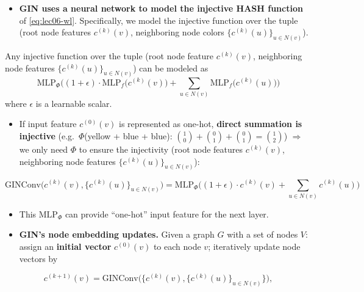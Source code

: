 \begin{itemize}
  \item \textbf{GIN uses a neural network to model the injective HASH function}
    of \cref{eq:lec06-wl}. Specifically, we model the injective function over the
    tuple (root node features $c^{(k)}(v)$, neighboring node colors
    $\{c^{(k)}(u)\}_{u\in N(v)}$).
\end{itemize}
\begin{proposition}[Xu et al.\ ICLR 2019]\label{prop:lec06-tuple}
  Any injective function over the tuple (root node feature $c^{(k)}(v)$,
  neighboring node features $\{c^{(k)}(u)\}_{u\in N(v)}$) can be modeled as
  \begin{equation}\label{eq:lec06-gintuple}
    \mathrm{MLP}_{\Phi}\Big((1+\epsilon)\cdot\mathrm{MLP}_f\big(c^{(k)}(v)\big)
      + \sum_{u\in N(v)}\mathrm{MLP}_f\big(c^{(k)}(u)\big)\Big)
  \end{equation}
  where $\epsilon$ is a learnable scalar.
\end{proposition}
\begin{itemize}
  \item If input feature $c^{(0)}(v)$ is represented as one-hot, \textbf{direct
    summation is injective} (e.g.\ $\Phi$(yellow + blue + blue):
    $\binom{1}{0}+\binom{0}{1}+\binom{0}{1}=\binom{1}{2}$) $\Rightarrow$ we only
    need $\Phi$ to ensure the injectivity (root node features $c^{(k)}(v)$,
    neighboring node features $\{c^{(k)}(u)\}_{u\in N(v)}$):
\end{itemize}
\begin{equation}\label{eq:lec06-ginconv}
  \mathrm{GINConv}\Big(c^{(k)}(v), \{c^{(k)}(u)\}_{u\in N(v)}\Big)
  = \mathrm{MLP}_{\Phi}\Big((1+\epsilon)\cdot c^{(k)}(v) + \sum_{u\in N(v)} c^{(k)}(u)\Big)
\end{equation}
\begin{itemize}
  \item This $\mathrm{MLP}_{\Phi}$ can provide ``one-hot'' input feature for the
    next layer.
  \item \textbf{GIN's node embedding updates.} Given a graph $G$ with a set of
    nodes $V$: assign an \textbf{initial vector} $c^{(0)}(v)$ to each node $v$;
    iteratively update node vectors by
\end{itemize}
\begin{equation}\label{eq:lec06-ginupdate}
  c^{(k+1)}(v) = \mathrm{GINConv}
    \Big(\big\{c^{(k)}(v), \{c^{(k)}(u)\}_{u\in N(v)}\big\}\Big),
\end{equation}
